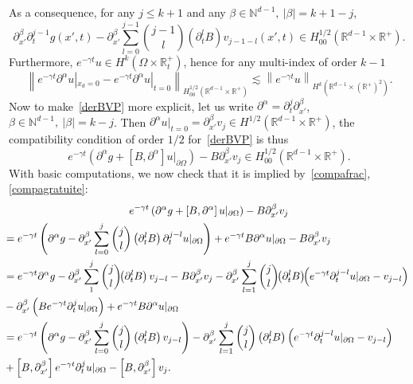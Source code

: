 \documentclass[10pt]{amsart}
\theoremstyle{definition}\newtheorem{defi}[theo]{Definition}\newtheorem{rema}[theo]{Remark}\newtheorem{exam}[theo]{Example}\newtheorem{exem}[theo]{Example}\newtheorem{nota}[theo]{Notation}
\newcommand{\R}{\mathbb{R}}
\newcommand{\N}{\mathbb{N}}
\begin{document}
As a consequence, for any $j\leq k+1$ and any $\beta\in \N^{d-1},\ |\beta|=k+1-j$,
\begin{equation}\label{compafrac}
\partial_{x'}^\beta\partial_t^{j-1}g(x',t) -\partial_{x'}^\beta\sum_{l=0}^{j-1}
\binom{j-1}{l}\left(\partial_t^lB\right)v_{j-1-l}(x',t)\in H^{1/2}_{00}\left(\R^{d-1}\times \R^+\right).
\end{equation}
Furthermore, $e^{-\gamma t}u\in H^k(\Omega
\times \R_t^+)$, hence for any multi-index of order $k-1$
\begin{equation}\label{compagratuite}
\left\|e^{-\gamma t}\partial^\alpha u|_{x_d=0} -e^{-\gamma t}\partial^\alpha u|_{t=0}\right\|_{H^{1/2}_{00}\left(\R^{d-1}\times \R^+\right)}
\lesssim \left\|e^{-\gamma t}u\right\|_{H^{k}\left(\R^{d-1}\times (\R^+)^2\right)}.
\end{equation}
Now to make~\eqref{derBVP} more explicit, let us write $\partial^\alpha=
\partial_t^{j}\partial_{x'}^\beta$, $\beta\in
\N^{d-1},\ |\beta|=k-j$. Then $\partial^\alpha u|_{t=0} =\partial_{x'}^\beta v_{j}\in H^{1/2}(\R^{d-1}\times \R^+)$, the compatibility condition of order $1/2$ for~\eqref{derBVP} is thus
\[
e^{-\gamma t}\left(\partial^\alpha g+ [B,\partial^\alpha]u|_{\partial\Omega}\right) -B\partial_{x'}^\beta v_{j}\in H^{1/2}_{00}\left(\R^{d-1}\times \R^+\right).
\]
With basic computations, we now check that it is implied by~\eqref{compafrac},\eqref{compagratuite}:
\begingroup
\allowdisplaybreaks
\begin{multline*}
e^{-\gamma t}\left(\partial^\alpha g + \left[B,\partial^\alpha\right]u|_{\partial\Omega}\right)-B\partial_{x'}^\beta v_{j}
\\
\mkern-10mu{\begin{aligned}
&= e^{-\gamma t}\left(\partial^\alpha g-\partial_{x'}^\beta
\sum_{l=0}^j\binom{j}{l}\left(\partial_t^lB\right)\partial_t^{j-l}u|_{\partial\Omega}\right) +e^{-\gamma t}B\partial^\alpha u|_{\partial\Omega}-B\partial_{x'}^\beta v_{j}
\\
&=e^{-\gamma t}\partial^\alpha g -\partial_{x'}^\beta \sum_1^j\binom{j}{l}\!\!\left(\partial_t^lB\right) v_{j-l} -B\partial_{x'}^\beta v_{j}
-\partial_{x'}^\beta\sum_{l=1}^j
\binom{j}{l}\!\!\left(\partial_t^lB\right)
\!\!\left(e^{-\gamma t}\partial_t^{j-l}u|_{\partial\Omega} -v_{j-l}\right)\\
& -\partial_{x'}^\beta \left(Be^{-\gamma t}\partial_t^j u|_{\partial\Omega}\right) +e^{-\gamma t}B\partial^\alpha u|_{\partial\Omega}\\
&=e^{-\gamma t}\left(\partial^\alpha g -\partial_{x'}^\beta \sum_{l=0}^j\binom{j}{l}\left(\partial_t^lB\right)v_{j-l}\right)
 -\partial_{x'}^\beta\sum_{l=1}^j
\binom{j}{l}\left(\partial_t^lB\right)
\left(e^{-\gamma t}\partial_t^{j-l}u|_{\partial\Omega}-v_{j-l}\right)\\
&+\left[B,\partial_{x'}^\beta\right]e^{-\gamma t}\partial_t^ju|_{\partial\Omega} -\left[B,\partial_{x'}^\beta\right]v_{j}.
\end{aligned}}
\end{multline*}
\end{document}
